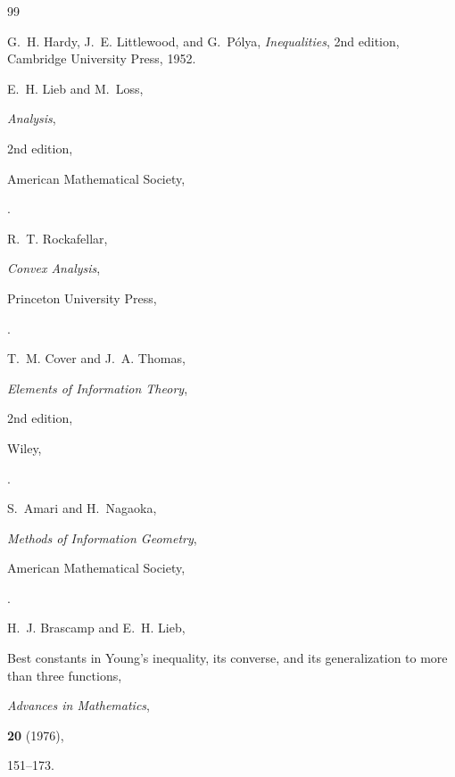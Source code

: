 \documentclass[11pt]{amsart}
\begin{document}
\iffalse
\begin{thebibliography}{99}



G.~H. Hardy, J.~E. Littlewood, and G.~Pólya, \emph{Inequalities}, 2nd edition, Cambridge University Press, 1952.




E.~H. Lieb and M.~Loss,

\newblock
\emph{Analysis},

\newblock
2nd edition,

\newblock
American Mathematical Society,

.




R.~T. Rockafellar,

\newblock
\emph{Convex Analysis},

\newblock
Princeton University Press,

.




T.~M. Cover and J.~A. Thomas,

\newblock
\emph{Elements of Information Theory},

\newblock
2nd edition,

\newblock
Wiley,

.




S.~Amari and H.~Nagaoka,

\newblock
\emph{Methods of Information Geometry},

\newblock
American Mathematical Society,

.




H.~J. Brascamp and E.~H. Lieb,

\newblock
Best constants in Young's inequality, its converse, and its
generalization to more than three functions,

\newblock
\emph{Advances in Mathematics},

\textbf{20} (1976),

151--173.





\end{thebibliography}
\end{document}
